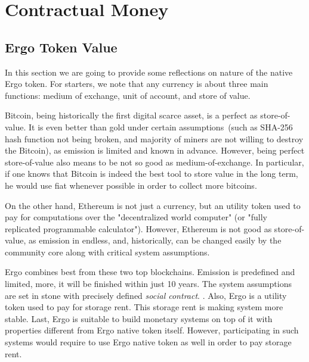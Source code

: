 \section{Contractual Money}
    \label{sec:contractual}




\subsection{Ergo Token Value}
 \label{sec:ergo-value}

 In this section we are going to provide some reflections on nature of the native Ergo token. For starters, we note that
 any currency is about three main functions: medium of exchange, unit of account, and store of value.

 Bitcoin, being historically the first digital scarce asset, is a perfect as store-of-value. It is even better than
 gold under certain assumptions~(such as SHA-256 hash function not being broken, and majority of miners are not willing
 to destroy the Bitcoin), as emission is limited and known in advance. However, being perfect store-of-value also means
 to be not so good as medium-of-exchange. In particular, if one knows that Bitcoin is indeed the best tool to store
 value in the long term, he would use fiat whenever possible in order to collect more bitcoins.

 On the other hand, Ethereum is not just a currency, but an utility token used to pay for computations over the
 "decentralized world computer" (or "fully replicated programmable calculator"). However, Ethereum is not good as
 store-of-value, as emission in endless, and, historically, can be changed easily by the community core along with
 critical system assumptions.

 Ergo combines best from these two top blockchains. Emission is predefined and limited, more, it will be finished within
 just 10 years. The system assumptions are set in stone with precisely defined {\em social contract}. . Also,
 Ergo is a utility token used to pay for storage rent. This storage rent is making system more stable. Last, Ergo is
 suitable to build monetary systems on top of it with properties different from Ergo native token itself. However,
 participating in such systems would require to use Ergo native token as well in order to pay storage rent.

